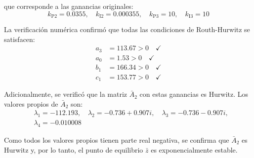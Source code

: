 que corresponde a las ganancias originales:
\begin{equation}\label{eq:gains_solution}
    k_{\textrm{P2}} = 0.0355, \quad k_{\textrm{I2}} = 0.000355, \quad 
    k_{\textrm{P3}} = 10, \quad k_{\textrm{I3}} = 10
\end{equation}

La verificación numérica confirmó que todas las condiciones de Routh-Hurwitz se satisfacen:
\begin{align*}
    a_3 &= 113.67 > 0 \quad \checkmark \\
    a_0 &= 1.53 > 0 \quad \checkmark \\
    b_1 &= 166.34 > 0 \quad \checkmark \\
    c_1 &= 153.77 > 0 \quad \checkmark
\end{align*}

Adicionalmente, se verificó que la matriz $\bar{A}_2$ con estas ganancias es Hurwitz. 
Los valores propios de $\bar{A}_2$ son:
\begin{equation} \label{eq:eigenvalues}
    \begin{aligned}
        &\lambda_1 = -112.193, \quad \lambda_2 = -0.736 + 0.907i, \quad \lambda_3 = -0.736 - 0.907i,\\
        &\lambda_4 = -0.010008
    \end{aligned}
\end{equation}

Como todos los valores propios tienen parte real negativa, se confirma que $\bar{A}_2$ es 
Hurwitz y, por lo tanto, el punto de equilibrio $\bar{z}$ es exponencialmente estable.



